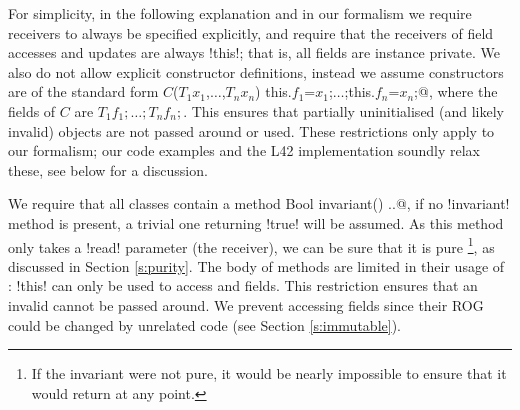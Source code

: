 For simplicity, in the following explanation and in our formalism
we require 
receivers to always be specified explicitly, and require that the receivers of field accesses and updates are always \Q!this!; that is, all fields are instance private.
We also do not allow explicit constructor definitions, instead we assume constructors are of the standard form \Q@$C$($T_1 x_1$,$\ldots$,$T_n x_n$) {this.$f_1$=$x_1$;$\ldots$;this.$f_n$=$x_n$;}@, where the fields of $C$ are $T_1 f_1;\ldots; T_n f_n;$. This ensures that partially uninitialised (and likely invalid) objects are not passed around or used. 
These restrictions only apply to our formalism; our code examples and the L42 implementation soundly relax these, see below for a discussion.%

We require that all classes contain a \Q@read method Bool invariant() {..}@, if no \Q!invariant! method is present, a trivial one returning \Q!true! will be assumed. As this method only takes a \Q!read! parameter (the receiver), we can be sure that it is pure \footnote{If the invariant were not pure, it would be nearly impossible to ensure that it would return \Q@true@ at any point.}, as discussed in Section \ref{s:purity}.
The body of \Q@invariant@ methods are limited in their usage of \Q@this@: \Q!this! can only be used to access \Q@imm@ and \Q@capsule@ fields. This restriction ensures that 
an invalid \Q@this@ cannot be passed around.
We prevent accessing \Q@mut@ fields since their ROG could be changed by unrelated code (see Section \ref{s:immutable}).%

